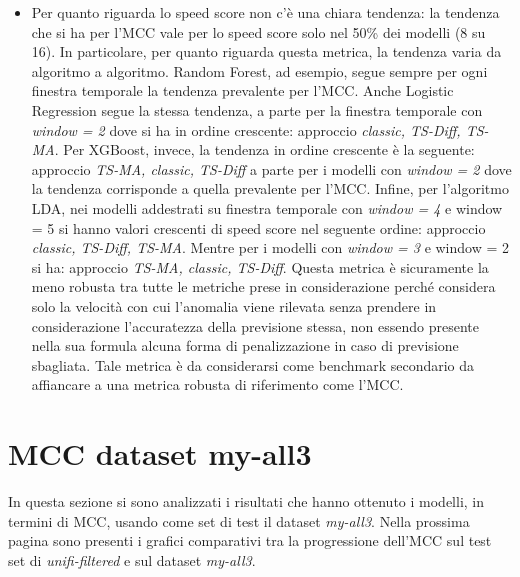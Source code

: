 \begin{itemize}
    \item Per quanto riguarda lo speed score non c'\`e una chiara tendenza: la tendenza che si ha per l'MCC vale per lo speed score solo nel 50\% dei modelli (8 su 16). In particolare, per quanto riguarda questa metrica, la tendenza varia da algoritmo a algoritmo. Random Forest, ad esempio, segue sempre per ogni finestra temporale la tendenza prevalente per l'MCC. Anche Logistic Regression segue la stessa tendenza, a parte per la finestra temporale con \textit{window = 2} dove si ha in ordine crescente: approccio \textit{classic, TS-Diff, TS-MA}. Per XGBoost, invece, la tendenza in ordine crescente \`e la seguente: approccio \textit{TS-MA, classic, TS-Diff} a parte per i modelli con \textit{window = 2} dove la tendenza corrisponde a quella prevalente per l'MCC. Infine, per l'algoritmo LDA, nei modelli addestrati su finestra temporale con \textit{window = 4} e {window = 5} si hanno valori crescenti di speed score nel seguente ordine: approccio \textit{classic, TS-Diff, TS-MA}. Mentre per i modelli con \textit{window = 3} e {window = 2} si ha: approccio \textit{TS-MA, classic, TS-Diff}. Questa metrica \`e sicuramente la meno robusta tra tutte le metriche prese in considerazione perch\'e considera solo la velocit\`a con cui l'anomalia viene rilevata senza prendere in considerazione l'accuratezza della previsione stessa, non essendo presente nella sua formula alcuna forma di penalizzazione in caso di previsione sbagliata. Tale metrica \`e da considerarsi come benchmark secondario da affiancare a una metrica robusta di riferimento come l'MCC.
    
\end{itemize}


\section{MCC dataset my-all3}
In questa sezione si sono analizzati i risultati che hanno ottenuto i modelli, in termini di MCC, usando come set di test il dataset \textit{my-all3}. Nella prossima pagina sono presenti i grafici comparativi tra la progressione dell'MCC sul test set di \textit{unifi-filtered} e sul dataset \textit{my-all3}.


